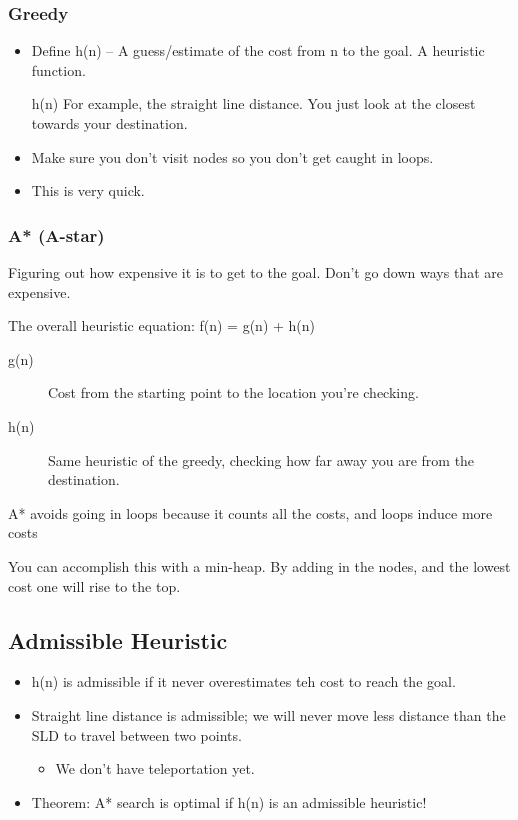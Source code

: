 \documentclass{article}
\begin{document}
\subsubsection{Greedy}
\label{sec:orgf048066}
\begin{itemize}
\item Define h(n) -- A guess/estimate of the cost from n to the goal. A heuristic function.
\item[{h(n)}] For example, the straight line distance. You just look at the closest towards your destination.
\item Make sure you don't visit nodes so you don't get caught in loops.
\item This is very quick.
\end{itemize}
\subsubsection{A* (A-star)}
\label{sec:org6585eae}
\begin{description}
\item[{The basic plan}] Figuring out how expensive it is to get to the goal. Don't go down ways that are expensive.
\item The overall heuristic equation: f(n) = g(n) + h(n)
\begin{description}
\item[{g(n)}] Cost from the starting point to the location you're checking.
\item[{h(n)}] Same heuristic of the greedy, checking how far away you are from the destination.
\end{description}
\item A* avoids going in loops because it counts all the costs, and loops induce more costs
\item You can accomplish this with a min-heap. By adding in the nodes, and the lowest cost one will rise to the top.
\end{description}

\subsection{Admissible Heuristic}
\label{sec:org5b31692}
\begin{itemize}
\item h(n) is admissible if it never overestimates teh cost to reach the goal.
\item Straight line distance is admissible; we will never move less distance than the SLD to travel between two points.
\begin{itemize}
\item We don't have teleportation yet.
\end{itemize}
\item Theorem: A* search is optimal if h(n) is an admissible heuristic!
\end{itemize}
\end{document}
